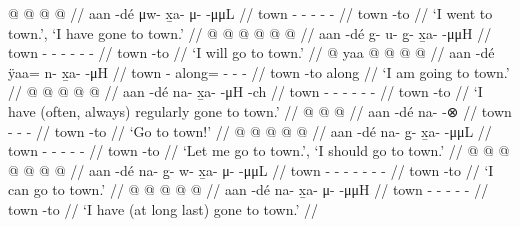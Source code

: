 \documentclass[12pt,letterpaper,oneside,article]{memoir}
\begin{document}
\pex\label{ex:motpos-motasp}%
\a\label{ex:motpos-motasp-pfv}%
%
\begingl
	\gla	{} @ {}  @ {} @ {} @ {} //
	\glb	aan -dé μw- x̱a- μ-  -μμL //
	\glc	town - - - -  - //
	\gld	town -to  {} {} {} //
	\glft	‘I went to town.’, ‘I have gone to town.’
		//
\endgl
\a\label{ex:motpos-motasp-prosp}%
%
\begingl
	\gla	{} @ {}  @ {} @ {} @ {} @ {} @ {} //
	\glb	aan -dé g- u- g̱- x̱a-  -μμH //
	\glc	town - - - - -  - //
	\gld	town -to  {} {} {} {} {} //
	\glft	‘I will go to town.’
		//
\endgl
\a\label{ex:motpos-motasp-prog}%
%
\begingl
	\gla	{} @ {} yaa @  @ {} @ {} @ {} //
	\glb	aan -dé ÿaa= n- x̱a-  -μH //
	\glc	town - along= - -  - //
	\gld	town -to along  {} {} {} //
	\glft	‘I am going to town.’
		//
\endgl
\a\label{ex:motpos-motasp-hab}%
%
\begingl
	\gla	{} @ {}  @ {} @ {} @ {} @ {} //
	\glb	aan -dé na- x̱a-  -μH -ch //
	\glc	town - - - -  - - //
	\gld	town -to  {} {} {} {} //
	\glft	‘I have (often, always) regularly gone to town.’
		//
\endgl
\a\label{ex:motpos-motasp-imp}%
%
\begingl
	\gla	{} @ {}  @ {} @ {} //
	\glb	aan -dé na-  -⊗ //
	\glc	town - -  - //
	\gld	town -to  {} {} //
	\glft	‘Go to town!’
		//
\endgl
\a\label{ex:motpos-motasp-hort}%
%
\begingl
	\gla	{} @ {}  @ {} @ {} @ {} @ {} //
	\glb	aan -dé na- g̱- x̱a-  -μμL //
	\glc	town - - - -  - //
	\gld	town -to  {} {} {} {} //
	\glft	‘Let me go to town.’, ‘I should go to town.’
		//
\endgl
\a\label{ex:motpos-motasp-pot}%
%
\begingl
	\gla	{} @ {}  @ {} @ {} @ {} @ {} @ {} @ {} //
	\glb	aan -dé na- g̱- w- x̱a- μ-  -μμL //
	\glc	town - - - - - -  - //
	\gld	town -to  {} {} {} {} {} {} //
	\glft	‘I can go to town.’
		//
\endgl
\a\label{ex:motpos-motasp-rlzn}%
%
\begingl
	\gla	{} @ {}  @ {} @ {} @ {} @ {} //
	\glb	aan -dé na- x̱a- μ-  -μμH //
	\glc	town - - - -  - //
	\gld	town -to  {} {} {} {} //
	\glft	‘I have (at long last) gone to town.’
		//
\endgl
\xe
\end{document}
